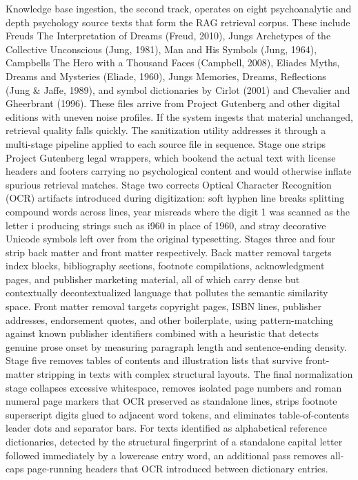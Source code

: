 \documentclass[12pt,a4paper]{report}
\DeclareRobustCommand{\code}[1]{\texttt{\detokenize{#1}}}
\begin{document}
Knowledge base ingestion, the second track, operates on eight psychoanalytic and depth psychology source texts that form the RAG retrieval corpus. These include Freud\textquotesingle{}s \textquotedbl{}The Interpretation of Dreams\textquotedbl{} (Freud, 2010), Jung\textquotesingle{}s \textquotedbl{}Archetypes of the Collective Unconscious\textquotedbl{} (Jung, 1981), \textquotedbl{}Man and His Symbols\textquotedbl{} (Jung, 1964), Campbell\textquotesingle{}s \textquotedbl{}The Hero with a Thousand Faces\textquotedbl{} (Campbell, 2008), Eliade\textquotesingle{}s \textquotedbl{}Myths, Dreams and Mysteries\textquotedbl{} (Eliade, 1960), Jung\textquotesingle{}s \textquotedbl{}Memories, Dreams, Reflections\textquotedbl{} (Jung \& Jaffe, 1989), and symbol dictionaries by Cirlot (2001) and Chevalier and Gheerbrant (1996). These files arrive from Project Gutenberg and other digital editions with uneven noise profiles. If the system ingests that material unchanged, retrieval quality falls quickly. The sanitization utility \code{clean_for_rag.py} addresses it through a multi-stage pipeline applied to each source file in sequence. Stage one strips Project Gutenberg legal wrappers, which bookend the actual text with license headers and footers carrying no psychological content and would otherwise inflate spurious retrieval matches. Stage two corrects Optical Character Recognition (OCR) artifacts introduced during digitization: soft hyphen line breaks splitting compound words across lines, year misreads where the digit 1 was scanned as the letter i producing strings such as i960 in place of 1960, and stray decorative Unicode symbols left over from the original typesetting. Stages three and four strip back matter and front matter respectively. Back matter removal targets index blocks, bibliography sections, footnote compilations, acknowledgment pages, and publisher marketing material, all of which carry dense but contextually decontextualized language that pollutes the semantic similarity space. Front matter removal targets copyright pages, ISBN lines, publisher addresses, endorsement quotes, and other boilerplate, using pattern-matching against known publisher identifiers combined with a heuristic that detects genuine prose onset by measuring paragraph length and sentence-ending density. Stage five removes tables of contents and illustration lists that survive front-matter stripping in texts with complex structural layouts. The final normalization stage collapses excessive whitespace, removes isolated page numbers and roman numeral page markers that OCR preserved as standalone lines, strips footnote superscript digits glued to adjacent word tokens, and eliminates table-of-contents leader dots and separator bars. For texts identified as alphabetical reference dictionaries, detected by the structural fingerprint of a standalone capital letter followed immediately by a lowercase entry word, an additional pass removes all-caps page-running headers that OCR introduced between dictionary entries.
\end{document}
